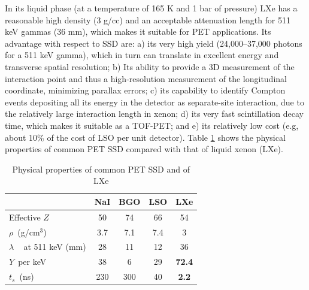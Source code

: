 In its liquid phase (at a temperature of 165 K and 1 bar of pressure) LXe has a reasonable high density (3 g/cc) and an acceptable attenuation length for 511 keV gammas (36 mm), which makes it suitable for PET applications. Its advantage with respect to SSD are: a) its very high yield (24,000--37,000 photons for a 511 keV gamma), which in turn can translate in excellent energy and transverse spatial resolution; b) Its ability to provide a 3D measurement of the interaction point and thus a high-resolution measurement of the longitudinal coordinate, minimizing parallax errors; c) its capability to identify Compton events depositing all its energy in the detector as separate-site interaction, due to the relatively large interaction length in xenon;  d) its very fast scintillation decay time, which makes it suitable as a TOF-PET;  and e) its relatively low cost (e.g, about 10\% of the cost of LSO per unit detector).  Table \ref{table.SDPP} shows the physical properties of common PET SSD compared with that of liquid xenon (LXe). 


\begin{table}[htdp!]
\caption{Physical properties of common PET SSD and of LXe}
\begin{center}
\begin{tabular}{l|cccc}
\toprule
& \textbf{NaI} & \textbf{BGO} & \textbf{LSO} & \textbf{LXe}\\
\hline
Effective $Z$ & 50 & 74 & 66 & 54 \\
$\rho$~(g/cm$^3$) & 3.7 & 7.1 & 7.4 &  3 \\
$\lambda$ ~ at 511 keV (mm) & 28 & 11 & 12 & 36 \\
$Y$~per keV & 38 & 6 & 29 & {\bf 72.4} \\
$t_s$~(ns) & 230 & 300 & 40 & {\bf 2.2} \\
\toprule
\end{tabular}
\end{center}
\label{table.SDPP}
\end{table}%
